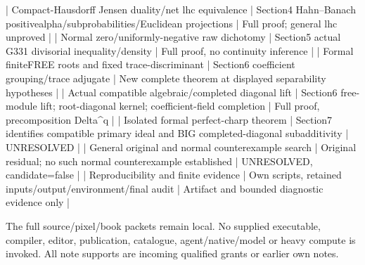 \documentclass[11pt]{article}
\begin{document}
\begin{QualifiedData}
| Compact-Hausdorff Jensen duality/net lhc equivalence | Section4 Hahn--Banach positivealpha/subprobabilities/Euclidean projections | Full proof; general lhc unproved |
| Normal zero/uniformly-negative raw dichotomy | Section5 actual G331 divisorial inequality/density | Full proof, no continuity inference |
| Formal finiteFREE roots and fixed trace-discriminant | Section6 coefficient grouping/trace adjugate | New complete theorem at displayed separability hypotheses |
| Actual compatible algebraic/completed diagonal lift | Section6 free-module lift; root-diagonal kernel; coefficient-field completion | Full proof, precomposition Delta^q |
| Isolated formal perfect-charp theorem | Section7 identifies compatible primary ideal and BIG completed-diagonal subadditivity | UNRESOLVED |
| General original and normal counterexample search | Original residual; no such normal counterexample established | UNRESOLVED, candidate=false |
| Reproducibility and finite evidence | Own scripts, retained inputs/output/environment/final audit | Artifact and bounded diagnostic evidence only |

The full source/pixel/book packets remain local. No supplied executable, compiler, editor, publication, catalogue, agent/native/model or heavy compute is invoked. All note supports are incoming qualified grants or earlier own notes.
\end{QualifiedData}
\end{document}
